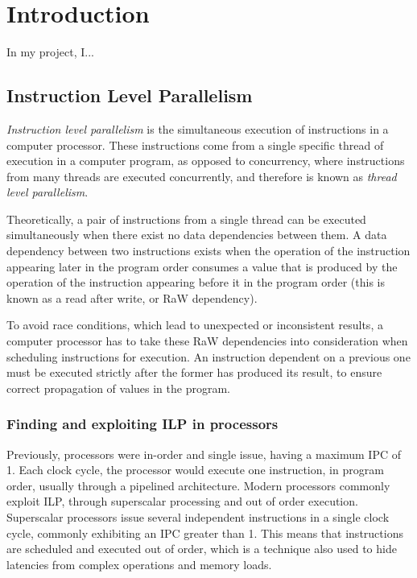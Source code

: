 \chapter{Introduction} \label{chap:intro}

In my project, I...

\section{Instruction Level Parallelism}

\textit{Instruction level parallelism} is the simultaneous execution of instructions in a computer processor. These 
instructions come from a single specific thread of execution in a computer program, as opposed to 
concurrency, where instructions from many threads are executed concurrently, and therefore is known as
\textit{thread level parallelism}.

Theoretically, a pair of instructions from a single thread can be executed simultaneously when there exist no data 
dependencies between them. A data dependency between two instructions exists when the operation of the instruction
appearing later in the program order consumes a value that is produced by the operation of the instruction appearing 
before it in the program order (this is known as a read after write, or RaW dependency).

To avoid race conditions, which lead to unexpected or inconsistent results, a computer processor has to take these 
RaW dependencies into consideration when scheduling instructions for execution. An instruction dependent on a previous
one must be executed strictly after the former has produced its result, to ensure correct propagation of values in the 
program.

\subsection{Finding and exploiting ILP in processors}

Previously, processors were in-order and single issue, having a maximum IPC of 1. Each clock cycle, the processor would 
execute one instruction, in program order, usually through a pipelined architecture.
Modern processors commonly exploit ILP, through superscalar processing and out of order execution.
Superscalar processors issue several independent instructions in a single clock cycle, commonly exhibiting an IPC 
greater than 1. This means that instructions are scheduled and executed out of order, which is a technique also used
to hide latencies from complex operations and memory loads.

